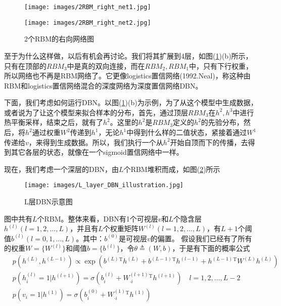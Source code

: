 \begin{figure}[H]
  \centering
  \begin{varwidth}[t]{\textwidth}
    \vspace{0pt}
    \texttt{[image: images/2RBM\_right\_net1.jpg]}
  \end{varwidth}
  \qquad\qquad
  \begin{varwidth}[t]{\textwidth}
    \vspace{0pt}
    \texttt{[image: images/2RBM\_right\_net2.jpg]}
  \end{varwidth}
  \caption{2个RBM的右向网络图}
  \label{fig:2个RBM的右向网络图}
\end{figure}
        至于为什么这样做，以后有机会再讨论。我们将其扩展到4层，如图(\ref{fig:2个RBM的右向网络图})(b)所示，只有在顶部的$RBM_3$中是真的双向连接，而在$RBM_2,RBM_1$中，只有下行权重，所以网络也不再是RBM网络了。它更像logistics置信网络(1992.Neal)，称这种由RBM和logistics置信网络混合的深度网络为深度置信网络DBN。
        \par
        下面，我们考虑如何运行DBN。以图(\ref{fig:2个RBM的右向网络图})(b)为示例，为了从这个模型中生成数据，或者说为了让这个模型来拟合样本的分布，首先，通过顶层$RBM _3$在$h^2,h^3$中进行热平衡采样，结束之后，就有了$h^2$。这里的$h^2$是$RBM_3$定义的$h^2$的先验分布，然后，将$h^2$通过权重$W^2$传递到$h^1$，无论$h^1$中得到什么样的二值状态，紧接着通过$W^1$传递给$v$，来得到生成数据。所以，我们执行一个从$h^2$开始自顶而下的传播，去得到其它各层的状态，就像在一个sigmoid置信网络中一样。
        \par
        现在，我们考虑一个深层的DBN，由$L$个RBM堆积而成，如图(\ref{fig:L层DBN示意图})所示
            \begin{figure}[H]
            \centering
            \texttt{[image: images/L\_layer\_DBN\_illustration.jpg]}
            \caption{L层DBN示意图}
            \label{fig:L层DBN示意图}
            \end{figure}
        图中共有$L$个RBM。整体来看，DBN有1个可视层$v$和$L$个隐含层$h^{(l)}(l=1,2,\dots,L)$，并且有$L$个权重矩阵$W^{(l)}(l=1,2,\dots,L)$，有$L+1$个阈值$b^{(l)}(l=0,1,\dots,L)$。其中：$b^{(0)}$是可视层$v$的偏置。 假设我们已经有了所有的权重$W = \{W^{(l)}\}$和阈值$b= \{b^{(l)}\}$，令$\theta\triangleq (W,b)$，于是有下面的概率公式
        \begin{align*}
        & p(h^{(L)},h^{(L-1)}) \propto \exp\left(b^{(L)}{}^\mathrm{T} h^{(L)} + b^{(L-1)}{}^\mathrm{T} h^{(l-1)} + h^{(L-1)}{}^\mathrm{T}W^{(L)}h^{(L)}\right)\\
        & p(h_i^{(l)}=1|h^{(l+1)}) = \sigma  \left( b_i^{(l)} + W_{\cdot i}^{(l+1)}{}^\mathrm{T}h^{(l+1)} \right)  \quad l=1,2,\dots,L-2\\
        & p(v_i = 1| h^{(1)}) = \sigma \left( b_i^{(0)}+W_{\cdot i}^{(1)}{}^\mathrm{T}h^{(1)} \right)
        \end{align*}
